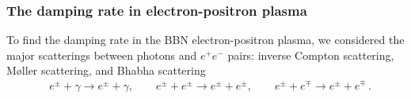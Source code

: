 


\subsubsection{The damping rate in electron-positron plasma}\label{sec:relax}
To find the damping rate in the BBN electron-positron plasma, we considered the major scatterings between photons and $e^+e^-$ pairs: inverse Compton scattering, M{\o}ller scattering, and Bhabha scattering
\begin{align}
&e^\pm+\gamma\longrightarrow e^\pm+\gamma,\qquad e^\pm+e^\pm\longrightarrow e^\pm+e^\pm,\qquad e^\pm+e^\mp\longrightarrow e^\pm+e^\mp\,.
\end{align}


